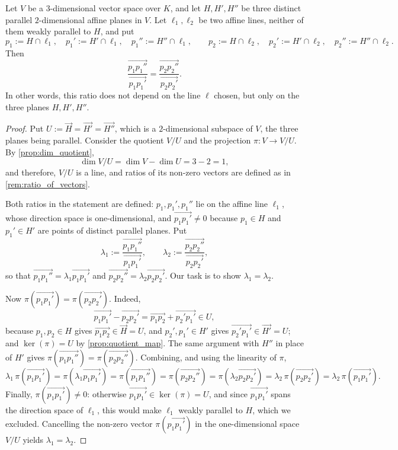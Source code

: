\begin{theorem}
  \label{thm:thales_affine}
  Let $V$ be a $3$-dimensional vector space over $K$, and let $H, H', H''$ be three distinct parallel $2$-dimensional affine planes in $V$. Let $\ell_1, \ell_2$ be two affine lines, neither of them weakly parallel to $H$, and put
  \[
  p_1 := H \cap \ell_1, \quad p_1' := H' \cap \ell_1, \quad p_1'' := H'' \cap \ell_1, \qquad p_2 := H \cap \ell_2, \quad p_2' := H' \cap \ell_2, \quad p_2'' := H'' \cap \ell_2.
  \]
  Then
  \[ \frac{\vec{p_1 p_1''}}{\vec{p_1 p_1'}} = \frac{\vec{p_2 p_2''}}{\vec{p_2 p_2'}}. \]
  In other words, this ratio does not depend on the line $\ell$ chosen, but only on the three planes $H, H', H''$.
\end{theorem}

\begin{proof}
Put $U := \vec{H} = \vec{H'} = \vec{H''}$, which is a $2$-dimensional subspace of $V$, the three planes being parallel. Consider the quotient $V/U$ and the projection $\pi \colon V \to V/U$. By \cref{prop:dim_quotient},
\[
\dim V/U = \dim V - \dim U = 3 - 2 = 1,
\]
and therefore, $V/U$ is a line, and ratios of its non-zero vectors are defined as in \cref{rem:ratio_of_vectors}.

Both ratios in the statement are defined: $p_1, p_1', p_1''$ lie on the affine line $\ell_1$, whose direction space is one-dimensional, and $\vec{p_1 p_1'} \neq 0$ because $p_1 \in H$ and $p_1' \in H'$ are points of distinct parallel planes. Put
\[
\lambda_1 := \frac{\vec{p_1 p_1''}}{\vec{p_1 p_1'}}, \qquad \lambda_2 := \frac{\vec{p_2 p_2''}}{\vec{p_2 p_2'}},
\]
so that $\vec{p_1 p_1''} = \lambda_1 \vec{p_1 p_1'}$ and $\vec{p_2 p_2''} = \lambda_2 \vec{p_2 p_2'}$. Our task is to show $\lambda_1 = \lambda_2$.

Now $\pi(\vec{p_1 p_1'}) = \pi(\vec{p_2 p_2'})$. Indeed,
\[
\vec{p_1 p_1'} - \vec{p_2 p_2'} = \vec{p_1 p_2} + \vec{p_2' p_1'} \in U,
\]
because $p_1, p_2 \in H$ gives $\vec{p_1 p_2} \in \vec{H} = U$, and $p_2', p_1' \in H'$ gives $\vec{p_2' p_1'} \in \vec{H'} = U$; and $\ker(\pi) = U$ by \cref{prop:quotient_map}. The same argument with $H''$ in place of $H'$ gives $\pi(\vec{p_1 p_1''}) = \pi(\vec{p_2 p_2''})$. Combining, and using the linearity of $\pi$,
\[
\lambda_1 \, \pi(\vec{p_1 p_1'}) = \pi(\lambda_1 \vec{p_1 p_1'}) = \pi(\vec{p_1 p_1''}) = \pi(\vec{p_2 p_2''}) = \pi(\lambda_2 \vec{p_2 p_2'}) = \lambda_2 \, \pi(\vec{p_2 p_2'}) = \lambda_2 \, \pi(\vec{p_1 p_1'}).
\]
Finally, $\pi(\vec{p_1 p_1'}) \neq 0$: otherwise $\vec{p_1 p_1'} \in \ker(\pi) = U$, and since $\vec{p_1 p_1'}$ spans the direction space of $\ell_1$, this would make $\ell_1$ weakly parallel to $H$, which we excluded. Cancelling the non-zero vector $\pi(\vec{p_1 p_1'})$ in the one-dimensional space $V/U$ yields $\lambda_1 = \lambda_2$.
\end{proof}

